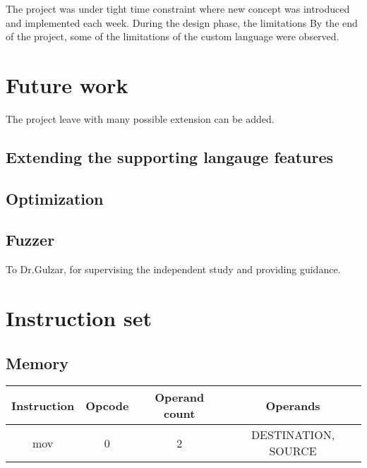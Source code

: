 \documentclass[manuscript,screen,nonacm]{acmart}
\begin{document}
The project was under tight time constraint where new concept was introduced and implemented each week. During the design phase, the limitations By the end of the project, some of the limitations of the custom language were observed. 

\section{Future work}
The project leave with many possible extension can be added.
\subsection{Extending the supporting langauge features}
\subsection{Optimization}
\subsection{Fuzzer}

\begin{acks}
To Dr.Gulzar, for supervising the independent study and providing guidance.
\end{acks}




\appendix

\section{Instruction set}
\subsection{Memory}
\begin{center}
\begin{tabular}{|c|c|c|c|}
    \hline
    Instruction & Opcode & Operand count & Operands \\
    \hline
    mov & 0 & 2 & DESTINATION, SOURCE \\
    \hline
\end{tabular}
\end{center}
\end{document}
